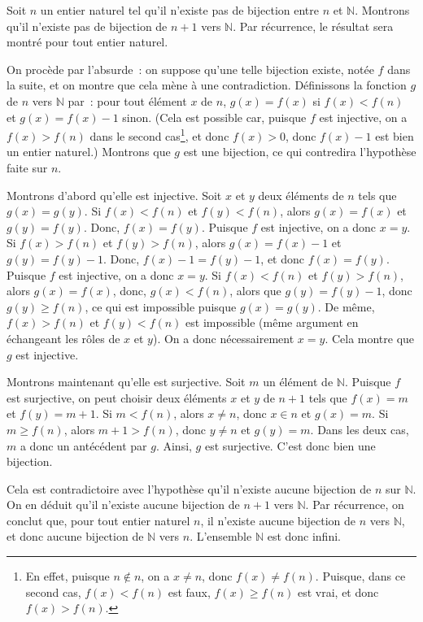     Soit $n$ un entier naturel tel qu'il n'existe pas de bijection entre $n$ et $\mathbb{N}$. 
    Montrons qu'il n'existe pas de bijection de $n+1$ vers $\mathbb{N}$. 
    Par récurrence, le résultat sera montré pour tout entier naturel.

    On procède par l'absurde : on suppose qu'une telle bijection existe, notée $f$ dans la suite, et on montre que cela mène à une contradiction. 
    Définissons la fonction $g$ de $n$ vers $\mathbb{N}$ par : pour tout élément $x$ de $n$, $g(x) = f(x)$ si $f(x) < f(n)$ et $g(x) = f(x)-1$ sinon. 
    (Cela est possible car, puisque $f$ est injective, on a $f(x) > f(n)$ dans le second cas\footnote{En effet, puisque $n \notin n$, on a $x \neq n$, donc $f(x) \neq f(n)$. Puisque, dans ce second cas, $f(x) < f(n)$ est faux, $f(x) \geq f(n)$ est vrai, et donc $f(x) > f(n)$.}, et donc $f(x) > 0$, donc $f(x) - 1$ est bien un entier naturel.)
    Montrons que $g$ est une bijection, ce qui contredira l'hypothèse faite sur $n$. 

    Montrons d'abord qu'elle est injective. 
    Soit $x$ et $y$ deux éléments de $n$ tels que $g(x) = g(y)$. 
    Si $f(x) < f(n)$ et $f(y) < f(n)$, alors $g(x) = f(x)$ et $g(y) = f(y)$. 
    Donc, $f(x) = f(y)$.
    Puisque $f$ est injective, on a donc $x=y$. 
    Si $f(x) > f(n)$ et $f(y) > f(n)$, alors $g(x) = f(x)-1$ et $g(y) = f(y)-1$. 
    Donc, $f(x)-1 = f(y)-1$, et donc $f(x) = f(y)$.
    Puisque $f$ est injective, on a donc $x=y$. 
    Si $f(x) < f(n)$ et $f(y) > f(n)$, alors $g(x) = f(x)$, donc, $g(x) < f(n)$, alors que $g(y) = f(y)-1$, donc $g(y) \geq f(n)$, ce qui est impossible puisque $g(x) = g(y)$.
    De même, $f(x) > f(n)$ et $f(y) < f(n)$ est impossible (même argument en échangeant les rôles de $x$ et $y$). 
    On a donc nécessairement $x=y$. 
    Cela montre que $g$ est injective. 

    Montrons maintenant qu'elle est surjective. 
    Soit $m$ un élément de $\mathbb{N}$. 
    Puisque $f$ est surjective, on peut choisir deux éléments $x$ et $y$ de $n+1$ tels que $f(x) = m$ et $f(y) = m+1$.
    Si $m < f(n)$, alors $x \neq n$, donc $x \in n$ et $g(x) = m$. 
    Si $m \geq f(n)$, alors $m+1 > f(n)$, donc $y \neq n$ et $g(y) = m$.
    Dans les deux cas, $m$ a donc un antécédent par $g$.
    Ainsi, $g$ est surjective. 
    C'est donc bien une bijection. 

    Cela est contradictoire avec l'hypothèse qu'il n'existe aucune bijection de $n$ sur $\mathbb{N}$. 
    On en déduit qu'il n'existe aucune bijection de $n+1$ vers $\mathbb{N}$.
    Par récurrence, on conclut que, pour tout entier naturel $n$, il n'existe aucune bijection de $n$ vers $\mathbb{N}$, et donc aucune bijection de $\mathbb{N}$ vers $n$. 
    L'ensemble $\mathbb{N}$ est donc infini.

